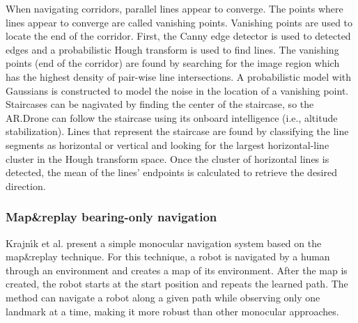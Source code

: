 When navigating corridors, parallel lines appear to converge.
The points where lines appear to converge are called vanishing points.
Vanishing points are used to locate the end of the corridor. 
First, the Canny edge detector \cite{canny1986computational} is used to detected edges and a probabilistic Hough transform \cite{kiryati1991probabilistic} is used to find lines.
The vanishing points (end of the corridor) are found by searching for the image region which has the highest density of pair-wise line intersections.
A probabilistic model with Gaussians is constructed to model the noise in the location of a vanishing point.
Staircases can be nagivated by finding the center of the staircase, so the AR.Drone can follow the staircase using its onboard intelligence (i.e., altitude stabilization).
Lines that represent the staircase are found by classifying the line segments as horizontal or vertical and looking for the largest horizontal-line cluster in the Hough transform space.
Once the cluster of horizontal lines is detected, the mean of the lines' endpoints is calculated to retrieve the desired direction.

\subsubsection{Map\&replay bearing-only navigation}
Krajn{\'\i}k et al. \cite{krajník2010simple,faiglsurveillance,krajník2011ar} present a simple monocular navigation system based on the map\&replay technique.
For this technique, a robot is navigated by a human through an environment and creates a map of its environment.
After the map is created, the robot starts at the start position and repeats the learned path.
The method can navigate a robot along a given path while observing only one landmark at a time, making it more robust than other monocular approaches.

